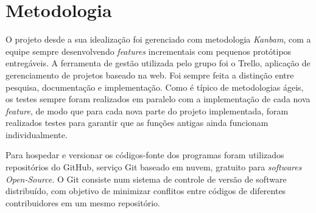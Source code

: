 \chapter{Metodologia}


O projeto desde a sua idealização foi gerenciado com metodologia \textit{Kanbam}, com a equipe sempre desenvolvendo \textit{features} incrementais com pequenos protótipos entregáveis. A ferramenta de gestão utilizada pelo grupo foi o Trello, aplicação de gerenciamento de projetos baseado na web. Foi sempre feita a distinção entre pesquisa, documentação e implementação. Como é típico de metodologias ágeis, os testes sempre foram realizados em paralelo com a implementação de cada nova \textit{feature}, de modo que para cada nova parte do projeto implementada, foram realizados testes para garantir que as funções antigas ainda funcionam individualmente.
\par
Para hospedar e versionar os códigos-fonte dos programas foram utilizados repositórios do GitHub, serviço Git baseado em nuvem, gratuito para \textit{softwares Open-Source}. O Git consiste num sistema de controle de versão de software distribuído, com objetivo de minimizar conflitos entre códigos de diferentes contribuidores em um mesmo repositório.
